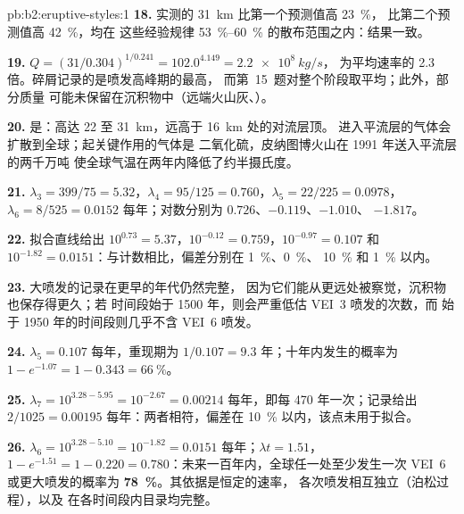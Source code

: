 \begin{solution}{pb:b2:eruptive-styles:1}
\textbf{18.} 实测的 \qty{31}{km} 比第一个预测值高 \qty{23}{\percent}，
比第二个预测值高 \qty{42}{\percent}，均在
这些经验规律 \qtyrange{53}{60}{\percent} 的散布范围之内：结果一致。

\textbf{19.} $Q = (31/0.304)^{1/0.241} = 102.0^{4.149} = \qty{2.2e8}{kg/s}$，
为平均速率的 2.3 倍。碎屑记录的是喷发高峰期的最高，
而第~15~题对整个阶段取平均；此外，部分质量
可能未保留在沉积物中（远端火山灰、）。

\textbf{20.} 是：高达 22 至 \qty{31}{km}，远高于 \qty{16}{km} 处的对流层顶。
进入平流层的气体会扩散到全球；起关键作用的气体是
二氧化硫，皮纳图博火山在 1991 年送入平流层的两千万吨
使全球气温在两年内降低了约半摄氏度。

\textbf{21.} $\lambda_3 = 399/75 = 5.32$，$\lambda_4 = 95/125 = 0.760$，$\lambda_5 = 22/225 =
0.0978$，$\lambda_6 = 8/525 = 0.0152$ 每年；对数分别为 $0.726$、$-0.119$、$-1.010$、
$-1.817$。

\textbf{22.} 拟合直线给出 $10^{0.73} = 5.37$，$10^{-0.12} = 0.759$，$10^{-0.97} =
0.107$ 和 $10^{-1.82} = 0.0151$：与计数相比，偏差分别在 \qty{1}{\percent}、\qty{0}{\percent}、
\qty{10}{\percent} 和 \qty{1}{\percent} 以内。

\textbf{23.} 大喷发的记录在更早的年代仍然完整，
因为它们能从更远处被察觉，沉积物也保存得更久；若
时间段始于 1500 年，则会严重低估 VEI~3 喷发的次数，而
始于 1950 年的时间段则几乎不含 VEI~6 喷发。

\textbf{24.} $\lambda_5 = \num{0.107}$ 每年，重现期为 $1/0.107 =
\num{9.3}\text{ 年}$；十年内发生的概率为 $1 - e^{-1.07} = 1 - 0.343 = \qty{66}{\percent}$。

\textbf{25.} $\lambda_7 = 10^{3.28 - 5.95} = 10^{-2.67} = 0.00214$ 每年，即每
470 年一次；记录给出 $2/1025 = 0.00195$ 每年：两者相符，偏差在
\qty{10}{\percent} 以内，该点未用于拟合。

\textbf{26.} $\lambda_6 = 10^{3.28 - 5.10} = 10^{-1.82} = 0.0151$ 每年；$\lambda t = 1.51$，
$1 - e^{-1.51} = 1 - 0.220 = 0.780$：未来一百年内，全球任一处至少发生一次
VEI~6 或更大喷发的概率为
\textbf{\qty[text-series-to-math=true]{78}{\percent}}。其依据是恒定的速率，
各次喷发相互独立（泊松过程），以及
在各时间段内目录均完整。
\end{solution}
